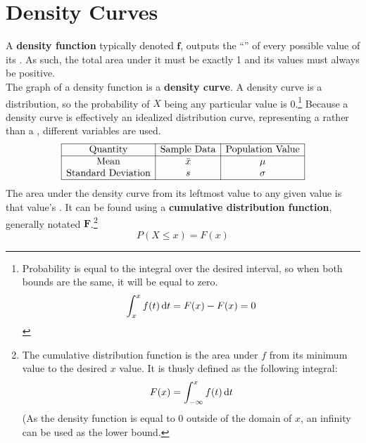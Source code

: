 \documentclass[../AP_Statistics.tex]{subfiles}
\begin{document}
		\section{Density Curves}
			A \textbf{density function} typically denoted $\pmb{f}$, outputs the \enquote{} of every possible value of its . As such, the total area under it must be exactly 1 and its values must always be positive. \\
			The graph of a density function is a \textbf{density curve}.
			A density curve is a  distribution, so the probability of $X$ being any particular value is 0.\footnote{Probability is equal to the integral over the desired interval, so when both bounds are the same, it will be equal to zero.\[\int_x^xf(t)\,\mathrm{d} t = F(x) - F(x) = 0\]}
			Because a density curve is effectively an idealized distribution curve, representing a  rather than a , different variables are used. \\ 
			\[\begin{array}{|c|c|c|}\hline
				\mathrm{Quantity} & \text{Sample Data} & \text{Population Value} \\\hline
				\mathrm{Mean} & \bar{x} & \mu \\
				\text{Standard Deviation} & s & \sigma \\\hline
			\end{array}\]
			The area under the density curve from its leftmost value to any given value is that value's . It can be found using a \textbf{cumulative distribution function}, generally notated $\pmb{F}$.\footnote{The cumulative distribution function is the area under $f$ from its minimum value to the desired $x$ value. It is thusly defined as the following integral:\[F(x) = \int_{-\infty}^xf(t)\,\mathrm{d} t\](As the density function is equal to 0 outside of the domain of $x$, an infinity can be used as the lower bound.}
			\[P(X \le x) = F(x)\]
\end{document}
